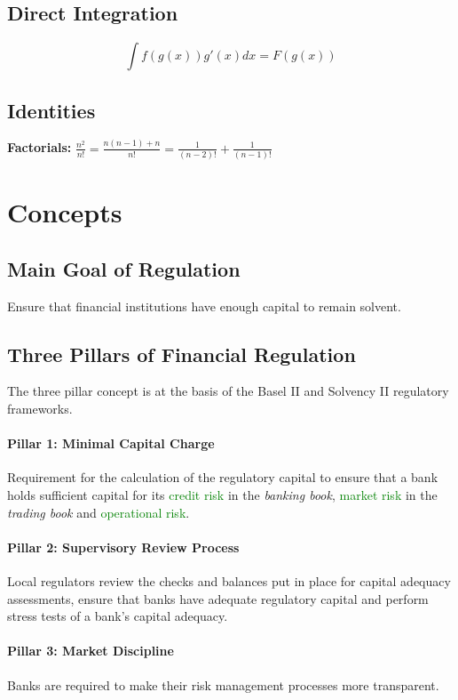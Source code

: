 \subsection*{Direct Integration}
\[
    \int f(g(x))g'(x)dx = F(g(x))
\]

\subsection*{Identities}
\textbf{Factorials:} $\frac{n^2}{n!} = \frac{n(n-1) + n}{n!} = \frac{1}{(n-2)!} + \frac{1}{(n-1)!}$

\section*{Concepts}
\subsection*{Main Goal of Regulation}
Ensure that financial institutions have enough capital to remain solvent.

\subsection*{Three Pillars of Financial Regulation}
The three pillar concept is at the basis of the Basel II and Solvency II
regulatory frameworks.

\paragraph{Pillar 1: Minimal Capital Charge} Requirement for the calculation of
the regulatory capital to ensure that a bank holds sufficient capital for its
\textcolor{green}{credit risk} in the \textit{banking book},
\textcolor{green}{market risk} in the \textit{trading book} and
\textcolor{green}{operational risk}.

\paragraph{Pillar 2: Supervisory Review Process} Local regulators review the
checks and balances put in place for capital adequacy assessments, ensure that
banks have adequate regulatory capital and perform stress tests of a bank's
capital adequacy.

\paragraph{Pillar 3: Market Discipline}
Banks are required to make their risk management processes more transparent.

